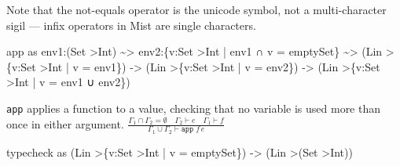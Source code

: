 \documentclass[
]{darts-v2021}
\newenvironment{Shaded}{}{}
\newcommand{\DataTypeTok}[1]{\textcolor[rgb]{0.56,0.13,0.00}{#1}}
\newcommand{\NormalTok}[1]{#1}
\newcommand{\OperatorTok}[1]{\textcolor[rgb]{0.40,0.40,0.40}{#1}}
\newcommand{\OtherTok}[1]{\textcolor[rgb]{0.00,0.44,0.13}{#1}}
\renewenvironment{quote}{\begin{myquote}}{\end{myquote}}
\begin{document}
\begin{quote}
Note that the not-equals operator is the unicode symbol, not a
multi-character sigil --- infix operators in Mist are single characters.
\end{quote}

\begin{Shaded}
\begin{Highlighting}[numbers=left,,firstnumber=13,]
\NormalTok{app as env1}\OperatorTok{:}\NormalTok{(}\DataTypeTok{Set} \OperatorTok{\textgreater{}}\DataTypeTok{Int}\NormalTok{) }\OperatorTok{\textasciitilde{}\textgreater{}}\NormalTok{ env2}\OperatorTok{:}\NormalTok{\{v}\OperatorTok{:}\DataTypeTok{Set} \OperatorTok{\textgreater{}}\DataTypeTok{Int} \OperatorTok{|}\NormalTok{ env1 ∩ v }\OtherTok{=}\NormalTok{ emptySet\} }\OperatorTok{\textasciitilde{}\textgreater{}}
\NormalTok{  (}\DataTypeTok{Lin} \OperatorTok{\textgreater{}}\NormalTok{\{v}\OperatorTok{:}\DataTypeTok{Set} \OperatorTok{\textgreater{}}\DataTypeTok{Int} \OperatorTok{|}\NormalTok{ v }\OtherTok{=}\NormalTok{ env1\})}
  \OtherTok{{-}\textgreater{}}\NormalTok{ (}\DataTypeTok{Lin} \OperatorTok{\textgreater{}}\NormalTok{\{v}\OperatorTok{:}\DataTypeTok{Set} \OperatorTok{\textgreater{}}\DataTypeTok{Int} \OperatorTok{|}\NormalTok{ v }\OtherTok{=}\NormalTok{ env2\})}
  \OtherTok{{-}\textgreater{}}\NormalTok{ (}\DataTypeTok{Lin} \OperatorTok{\textgreater{}}\NormalTok{\{v}\OperatorTok{:}\DataTypeTok{Set} \OperatorTok{\textgreater{}}\DataTypeTok{Int} \OperatorTok{|}\NormalTok{ v }\OtherTok{=}\NormalTok{ env1 ∪ env2\})}
\end{Highlighting}
\end{Shaded}

\texttt{app} applies a function to a value, checking that no variable is
used more than once in either argument.
\(\frac{\Gamma_1 \cap \Gamma_2 = \emptyset\quad \Gamma_2 \vdash e \quad \Gamma_1 \vdash f}{\Gamma_1 \cup \Gamma_2\vdash \texttt{app } f\, e}\)

\begin{Shaded}
\begin{Highlighting}[numbers=left,,firstnumber=19,]
\NormalTok{typecheck as (}\DataTypeTok{Lin} \OperatorTok{\textgreater{}}\NormalTok{\{v}\OperatorTok{:}\DataTypeTok{Set} \OperatorTok{\textgreater{}}\DataTypeTok{Int} \OperatorTok{|}\NormalTok{ v }\OtherTok{=}\NormalTok{ emptySet\}) }\OtherTok{{-}\textgreater{}}\NormalTok{ (}\DataTypeTok{Lin} \OperatorTok{\textgreater{}}\NormalTok{(}\DataTypeTok{Set} \OperatorTok{\textgreater{}}\DataTypeTok{Int}\NormalTok{))}
\end{Highlighting}
\end{Shaded}
\end{document}
